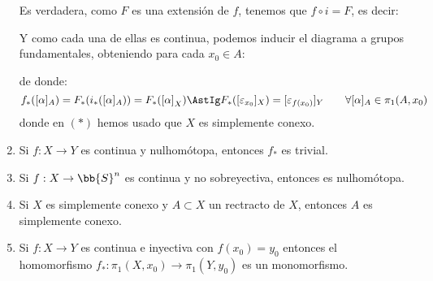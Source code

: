 \begin{ejercicio}
\begin{enumerate}[label=\alph*)]
            Es verdadera, como $F$ es una extensión de $f$, tenemos que $f\circ i = F$, es decir:
            \begin{figure}[H]
                \centering
            \end{figure}
            \noindent
            Y como cada una de ellas es continua, podemos inducir el diagrama a grupos fundamentales, obteniendo para cada $x_0\in A$:
            \begin{figure}[H]
                \centering
            \end{figure}
            de donde:
            \begin{equation*}
                f_\ast([\alpha]_A) = F_\ast(i_\ast([\alpha]_{A})) = F_\ast({[\alpha]}_{X}) \AstIg F_\ast([\varepsilon_{x_0}]_{X}) = [\varepsilon_{f(x_0)}]_Y \qquad \forall [\alpha]_A \in \pi_1(A,x_0)
            \end{equation*}
            donde en $(\ast)$ hemos usado que $X$ es simplemente conexo.
        \item Si $f:X\to Y$ es continua y nulhomótopa, entonces $f_\ast$ es trivial.
        \item Si $f:X\to \bb{S}^n$ es continua y no sobreyectiva, entonces es nulhomótopa.
        \item Si $X$ es simplemente conexo y $A\subset X$ un rectracto de $X$, entonces $A$ es simplemente conexo.
        \item Si $f:X\to Y$ es continua e inyectiva con $f(x_0)=y_0$ entonces el homomorfismo $f_\ast:\pi_1(X,x_0)\to \pi_1(Y,y_0)$ es un monomorfismo.


\end{enumerate}
\end{ejercicio}
